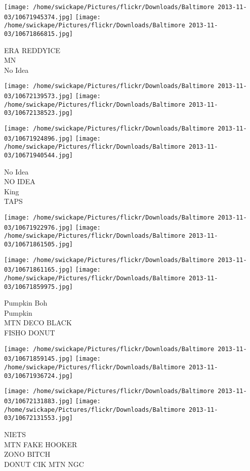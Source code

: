 \documentclass[10pt,letterpaper]{article}
\begin{document}
\vspace{0.25in}
\texttt{[image: /home/swickape/Pictures/flickr/Downloads/Baltimore 2013-11-03/10671945374.jpg]}
\texttt{[image: /home/swickape/Pictures/flickr/Downloads/Baltimore 2013-11-03/10671866815.jpg]}

ERA REDDYICE\\
MN\\
No Idea
\pagebreak

\texttt{[image: /home/swickape/Pictures/flickr/Downloads/Baltimore 2013-11-03/10672139573.jpg]}
\texttt{[image: /home/swickape/Pictures/flickr/Downloads/Baltimore 2013-11-03/10672138523.jpg]}

\texttt{[image: /home/swickape/Pictures/flickr/Downloads/Baltimore 2013-11-03/10671924896.jpg]}
\texttt{[image: /home/swickape/Pictures/flickr/Downloads/Baltimore 2013-11-03/10671940544.jpg]}

No Idea\\
NO IDEA\\
King\\
TAPS
\pagebreak

\texttt{[image: /home/swickape/Pictures/flickr/Downloads/Baltimore 2013-11-03/10671922976.jpg]}
\texttt{[image: /home/swickape/Pictures/flickr/Downloads/Baltimore 2013-11-03/10671861505.jpg]}

\texttt{[image: /home/swickape/Pictures/flickr/Downloads/Baltimore 2013-11-03/10671861165.jpg]}
\texttt{[image: /home/swickape/Pictures/flickr/Downloads/Baltimore 2013-11-03/10671859975.jpg]}

Pumpkin Boh\\
Pumpkin\\
MTN DECO BLACK\\
FISHO DONUT
\pagebreak

\texttt{[image: /home/swickape/Pictures/flickr/Downloads/Baltimore 2013-11-03/10671859145.jpg]}
\texttt{[image: /home/swickape/Pictures/flickr/Downloads/Baltimore 2013-11-03/10671936724.jpg]}

\texttt{[image: /home/swickape/Pictures/flickr/Downloads/Baltimore 2013-11-03/10672131883.jpg]}
\texttt{[image: /home/swickape/Pictures/flickr/Downloads/Baltimore 2013-11-03/10672131553.jpg]}

NIETS\\
MTN FAKE HOOKER\\
ZONO BITCH\\
DONUT CIK MTN NGC
\pagebreak
\end{document}
